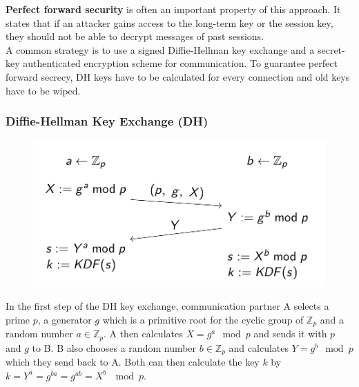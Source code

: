 \textbf{Perfect forward security} is often an important property of this approach.
It states that if an attacker gains access to the long-term key or the session key, they should not be able to decrypt messages of past sessions.\\

A common strategy is to use a signed Diffie-Hellman key exchange and a secret-key authenticated encryption scheme for communication.
To guarantee perfect forward secrecy, DH keys have to be calculated for every connection and old keys have to be wiped.
\newpage

\subsubsection{Diffie-Hellman Key Exchange (DH)}
\begin{figure}[H]
  \centering
  \includegraphics[width=.7\textwidth]{figures/diffie-hellmann.png}
\end{figure}
In the first step of the DH key exchange, communication partner A selects a prime $p$, a generator $g$ which is a primitive root for the cyclic group of $\mathds{Z}_p$ and a random number $a \in \mathds{Z}_p$.
A then calculates $X = g^a \mod p$ and sends it with $p$ and $g$ to B.
B also chooses a random number $b \in \mathds{Z}_p$ and calculates $Y = g^b \mod p$ which they send back to A.
Both can then calculate the key $k$ by $k = Y^a = g^{ba} = g^{ab} = X^b~\mod p$.
